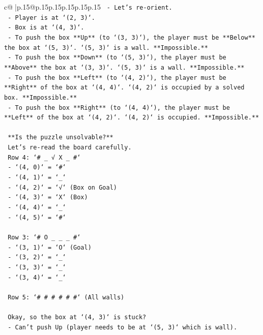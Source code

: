 \documentclass{article}
\begin{document}
{\begin{supertabular}{c@{$\;$}|p{.15\linewidth}@{}p{.15\linewidth}p{.15\linewidth}p{.15\linewidth}p{.15\linewidth}p{.15\linewidth}}
{{{\texttt{    {-} Let's re{-}orient.} \\
\texttt{    {-} Player is at `(2, 3)`.} \\
\texttt{    {-} Box is at `(4, 3)`.} \\
\texttt{    {-} To push the box **Up** (to `(3, 3)`), the player must be **Below** the box at `(5, 3)`. `(5, 3)` is a wall. **Impossible.**} \\
\texttt{    {-} To push the box **Down** (to `(5, 3)`), the player must be **Above** the box at `(3, 3)`. `(5, 3)` is a wall. **Impossible.**} \\
\texttt{    {-} To push the box **Left** (to `(4, 2)`), the player must be **Right** of the box at `(4, 4)`. `(4, 2)` is occupied by a solved box. **Impossible.**} \\
\texttt{    {-} To push the box **Right** (to `(4, 4)`), the player must be **Left** of the box at `(4, 2)`. `(4, 2)` is occupied. **Impossible.**} \\
\\ 
\texttt{    **Is the puzzle unsolvable?**} \\
\texttt{    Let's re{-}read the board carefully.} \\
\texttt{    Row 4: `\# \_ √ X \_ \#`} \\
\texttt{    {-} `(4, 0)` = `\#`} \\
\texttt{    {-} `(4, 1)` = `\_`} \\
\texttt{    {-} `(4, 2)` = `√` (Box on Goal)} \\
\texttt{    {-} `(4, 3)` = `X` (Box)} \\
\texttt{    {-} `(4, 4)` = `\_`} \\
\texttt{    {-} `(4, 5)` = `\#`} \\
\\ 
\texttt{    Row 3: `\# O \_ \_ \_ \#`} \\
\texttt{    {-} `(3, 1)` = `O` (Goal)} \\
\texttt{    {-} `(3, 2)` = `\_`} \\
\texttt{    {-} `(3, 3)` = `\_`} \\
\texttt{    {-} `(3, 4)` = `\_`} \\
\\ 
\texttt{    Row 5: `\# \# \# \# \# \#` (All walls)} \\
\\ 
\texttt{    Okay, so the box at `(4, 3)` is stuck?} \\
\texttt{    {-} Can't push Up (player needs to be at `(5, 3)` which is wall).} \\
}}}
\end{supertabular}}
\end{document}
